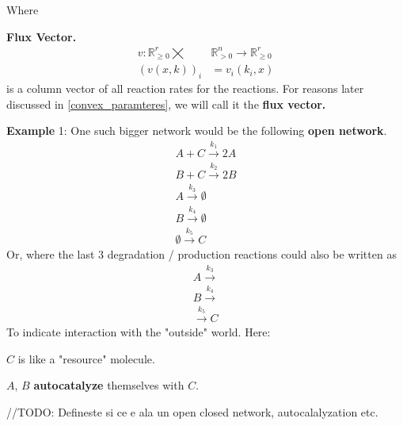 Where
\begin{definition}\label{flux_vector}
	\textbf{Flux Vector.}
	\begin{align}
		v : \mathbb{R}^r_{\geq 0}  \bigtimes &\mathbb{R}^n_{> 0} \rightarrow \mathbb{R}^r_{\geq 0}  \nonumber \\
		(v(x,k))_{i} &= v_i(k_i, x)
	\end{align}
	is a column vector of all reaction rates for the reactions. For reasons later discussed in \ref{convex_paramteres}, we will call it the \textbf{flux vector.}
\end{definition}

\newpage
\textbf{Example}\label{bigger_network_example1} 1:
One such bigger network would be the following \textbf{open network}.
\begin{align*}
	A + C \xrightarrow{k_{1}} 2A \\
	B + C \xrightarrow{k_{2}} 2B  \\
	A \xrightarrow{k_{3}} \emptyset \\
	B \xrightarrow{k_{4}} \emptyset \\
	\emptyset \xrightarrow{k_{5}} C
\end{align*}
Or, where the last $3$ degradation / production reactions could also be written as
\begin{align*}
	A \xrightarrow{k_{3}} \\
	B \xrightarrow{k_{4}} \\
	\xrightarrow{k_{5}} C	
\end{align*}
To indicate interaction with the "outside" world.
Here: 	

$C$ is like a "resource" molecule.

$A$, $B$ \textbf{autocatalyze} themselves with $C$.

\hfill\break
//TODO: Defineste si ce e ala un open closed network, autocalalyzation etc.
\hfill\break

